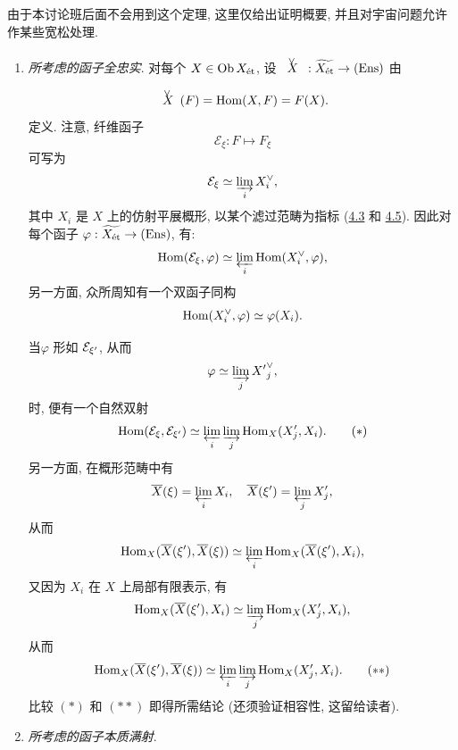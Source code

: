 由于本讨论班后面不会用到这个定理,
这里仅给出证明概要, 并且对宇宙问题允许作某些宽松处理.
\begin{enumerate}
\renewcommand{\theenumi}{\alph{enumi}}
\renewcommand{\labelenumi}{\theenumi)}
\item \emph{所考虑的函子全忠实}.
对每个 $X \in \operatorname{Ob} X_{\text{ét}}$,
设 $\Xv : \widetilde{X_{\text{ét}}} \to (\Ens)$ 由
$$
\Xv (F) = \Hom(X, F) = F(X){\quoi}.
$$
定义. 注意, 纤维函子
$$
\mathcal{E}_{\xi} : F \mapsto F_{\xi}
$$
可写为
$$
\mathcal{E}_{\xi} \simeq \varinjlim_i X^{\vee}_i{},
$$
其中 $X_{i}$ 是 $X$ 上的仿射平展概形,
以某个滤过范畴为指标
(\cf \hyperref[VIII.def4.3]{4.3} 和 \hyperref[VIII.subsec4.5]{4.5}).
因此对每个函子 $\varphi : \widetilde{X_{\text{ét}}} \to (\Ens)$, 有:
$$
\operatorname{Hom}(\mathcal{E}_{\xi}, \varphi) \simeq \varprojlim_{i}
\operatorname{Hom}(X^{\vee}_i, \varphi){},
$$
另一方面, 众所周知有一个双函子同构
$$
\operatorname{Hom}(X^{\vee}_i, \varphi) \simeq \varphi (X_i){}.
$$

当\pageoriginale $\varphi$ 形如 ${\mathcal E}_{\xi'}$, 从而
$$
\varphi \simeq \varinjlim_j {X'}_j^{\vee}{},
$$
时, 便有一个自然双射
\begin{equation*}
\operatorname{Hom} (\mathcal{E}_{\xi}, \mathcal{E}_{\xi'}) \simeq
\varprojlim_{i} \varinjlim_{j} \operatorname{Hom}_X (X'_j, X_i){}.\tag{$\ast$}
\end{equation*}
另一方面, 在概形范畴中有
$$
\overline{X}(\xi) = \varprojlim_{i} X_i,\quad \overline{X} (\xi') =
\varprojlim_{j} X'_j{},
$$
从而
$$
\operatorname{Hom}_{X} (\overline{X} (\xi'), \overline{X}(\xi)) \simeq \varprojlim_{i}
\operatorname{Hom}_X (\overline{X} (\xi'), X_i){},
$$
又因为 $X_i$ 在 $X$ 上局部有限表示, 有
$$
\operatorname{Hom}_X (\overline{X} (\xi'), X_i) \simeq \varinjlim_{j}
\operatorname{Hom}_X (X'_j, X_i){},
$$
从而
\begin{equation*}
\Hom_X (\bar{X} (\xi'), \bar{X} (\xi) ) \simeq
\varprojlim_{i} \varinjlim_{j} \Hom_X (X'_j,
X_i){\quoi}.\tag{${\ast}{\ast}$}
\end{equation*}
比较 $(\ast)$ 和 $({\ast}{\ast})$ 即得所需结论
(还须验证相容性, 这留给读者).

\item \emph{所考虑的函子本质满射}.
\end{enumerate}

\setcounter{subsection}{9}
\subsubsection{}

